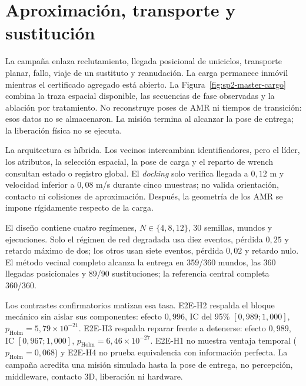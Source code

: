 \section*{Aproximación, transporte y sustitución}

La campaña enlaza reclutamiento, llegada posicional de uniciclos, transporte
planar, fallo, viaje de un sustituto y reanudación. La carga permanece inmóvil
mientras el certificado agregado está abierto. La Figura~\ref{fig:sp2-master-cargo}
combina la traza espacial disponible, las secuencias de fase observadas y la
ablación por tratamiento. No reconstruye poses de AMR ni tiempos de transición:
esos datos no se almacenaron. La misión termina al alcanzar la pose de entrega;
la liberación física no se ejecuta.


La arquitectura es híbrida. Los vecinos intercambian identificadores, pero el
líder, los atributos, la selección espacial, la pose de carga y el reparto de
wrench consultan estado o registro global. El \emph{docking} solo verifica
llegada a $0{,}12$ m y velocidad inferior a $0{,}08$ m/s durante cinco muestras;
no valida orientación, contacto ni colisiones de aproximación. Después, la
geometría de los AMR se impone rígidamente respecto de la carga.

El diseño contiene cuatro regímenes, $N\in\{4,8,12\}$, 30 semillas,
\CargoEtwoEWorlds{} mundos y \CargoEtwoERuns{} ejecuciones. Solo el régimen de
red degradada usa diez eventos, pérdida $0{,}25$ y retardo máximo de dos; los
otros usan siete eventos, pérdida $0{,}02$ y retardo nulo. El método vecinal
completo alcanza la entrega en 359/360 mundos, las 360 llegadas posicionales y
89/90 sustituciones; la referencia central completa 360/360.

Los contrastes confirmatorios matizan esa tasa. E2E-H2 respalda el bloque
mecánico sin aislar sus componentes: efecto $0{,}996$, IC del 95\%
$[0{,}989;1{,}000]$, $p_{\mathrm{Holm}}=5{,}79\times10^{-21}$. E2E-H3 respalda
reparar frente a detenerse: efecto $0{,}989$, IC
$[0{,}967;1{,}000]$, $p_{\mathrm{Holm}}=6{,}46\times10^{-27}$. E2E-H1 no muestra
ventaja temporal ($p_{\mathrm{Holm}}=0{,}068$) y E2E-H4 no prueba equivalencia
con información perfecta. La campaña acredita una misión simulada hasta la pose
de entrega, no percepción, middleware, contacto 3D, liberación ni hardware.
